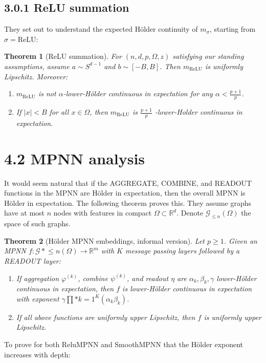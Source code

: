 \documentclass[11pt]{article}\usepackage{amsmath,amssymb,amsthm,bbm}
\newtheorem{theorem}{Theorem}
\newcommand{\1}{\mathbbm{1}}
\begin{document}
\subsection*{3.0.1 ReLU summation}
They set out to understand the expected Hölder continuity of $m_\sigma$, starting from $\sigma = \mathrm{ReLU}$:

\begin{theorem}[ReLU summation]
For $(n,d,p,\Omega,z)$ satisfying our standing assumptions, assume $a\sim S^{d-1}$ and $b\sim[-B,B]$. Then $m_{\mathrm{ReLU}}$ is uniformly Lipschitz. Moreover:
\begin{enumerate}
\item $m_{\mathrm{ReLU}}$ is not $\alpha$-lower-Hölder continuous in expectation for any $\alpha<\tfrac{p+1}{p}$.
\item If $|x|<B$ for all $x\in\Omega$, 
then $m_{\mathrm{ReLU}}$ is $\frac{p+1}{p}$
-lower-Holder continuous in expectation.
\end{enumerate}
\end{theorem}

\section*{4.2 MPNN analysis}
It would seem natural that if the AGGREGATE, COMBINE, and READOUT functions in the MPNN are Hölder in expectation, then the overall MPNN is Hölder in expectation. The following theorem proves this. They assume graphs have at most $n$ nodes with features in compact $\Omega\subset\mathbb{R}^d$. Denote $\mathcal{G}_{\le n}(\Omega)$ the space of such graphs.

\begin{theorem}[Hölder MPNN embeddings, informal version]
Let $p\ge1$. Given an MPNN $f:\mathcal{G}*{\le n}(\Omega)\to\mathbb{R}^m$ with $K$ message passing layers followed by a READOUT layer:
\begin{enumerate}
\item If aggregation $\varphi^{(k)}$, combine $\psi^{(k)}$, and readout $\eta$ are $\alpha_k,\beta_k,\gamma$ lower-Hölder continuous in expectation, then $f$ is lower-Hölder continuous in expectation with exponent $\gamma\prod*{k=1}^K(\alpha_k\beta_k)$.
\item If all above functions are uniformly upper Lipschitz, then $f$ is uniformly upper Lipschitz.
\end{enumerate}
\end{theorem}

To prove for both ReluMPNN and SmoothMPNN that the Hölder exponent increases with depth:
\end{document}
